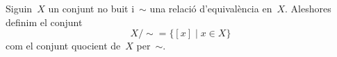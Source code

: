 \documentclass[../fonaments-de-les-matematiques.tex]{subfiles}
\begin{document}
    \begin{definition}
        \label{def:conjunt-quocient}
        Siguin~\(X\) un conjunt no buit i~\(\sim\) una relació d'equivalència en~\(X\).
        Aleshores definim el conjunt
        \[
            X/\sim=\{[x]\mid x\in X\}
        \]
        com el conjunt quocient de~\(X\) per~\(\sim\).
    \end{definition}
\end{document}
